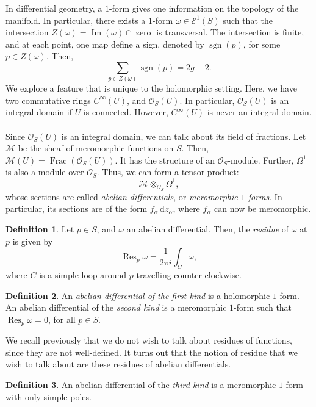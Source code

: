 \documentclass[a4paper]{report}
\theoremstyle{definition}
\newtheorem{definition}{Definition}
\theoremstyle{remark}
\theoremstyle{proposition}
\theoremstyle{conjecture}
\theoremstyle{lemma}
\theoremstyle{corollary}
\theoremstyle{exercise}
\theoremstyle{example}
\newcommand{\mcal}{\mathcal}
\newcommand{\diff}{\,\mathrm{d}}
\newcommand{\on}{\operatorname}
\begin{document}
In differential geometry, a $1$-form gives one information on the topology 
of the manifold. In particular, there exists a $1$-form 
$\omega \in \mcal{E}^1(S)$ such that the intersection 
$Z(\omega) = \on{Im}(\omega)\cap \on{zero}$ is transversal.
The intersection is finite, and at each point, one map define a sign,
denoted by $\on{sgn}(p)$, for some $p \in Z(\omega)$. 
Then,$$\sum_{p\in Z(\omega)} \on{sgn}(p) = 2g-2.$$
We explore
a feature that is unique to the holomorphic setting. Here, we have two 
commutative rings $C^\infty(U)$, and $\mcal{O}_S(U)$. In particular,
$\mcal{O}_S(U)$ is an integral domain if $U$ is connected. However,
$C^\infty(U)$ is never an integral domain. \\\\
Since $\mcal{O}_S(U)$ is an integral domain, we can talk about its field 
of fractions. 
Let $\mcal{M}$ be the sheaf of meromorphic functions on $S$. Then, 
$\mcal{M}(U) = \on{Frac}(\mcal{O}_S(U))$.
It has the structure of an $\mcal{O}_S$-module. Further, $\Omega^1$ is also
a module over $\mcal{O}_S$. Thus, we can form a tensor product:
$$\mcal{M}\otimes_{\mcal{O}_S} \Omega^1,$$
whose sections are called \emph{abelian differentials}, or \emph{meromorphic
$1$-forms}. In particular, its sections are of the form $f_\alpha\diff z_\alpha$,
where $f_\alpha$ can now be meromorphic.
\begin{definition}
    Let $p \in S$, and $\omega$ an abelian differential. 
    Then, the \emph{residue} of $\omega$ at $p$ is given by 
    $$\on{Res}_p\omega =\frac{1}{2\pi i} \int_C \omega,$$
    where $C$ is a simple loop around $p$ travelling counter-clockwise.
\end{definition}
\begin{definition}
    An \emph{abelian differential of the first kind} is a holomorphic 
    $1$-form. An abelian differential of the \emph{second kind} 
    is a meromorphic $1$-form such that $\on{Res}_p\omega = 0$,
    for all $p \in S$. 
\end{definition}

We recall previously that we do not wish to talk about residues of functions,
since they are not well-defined. It turns out that the notion of 
residue that we wish to talk about are these residues of abelian differentials.

\begin{definition}
    An abelian differential of the \emph{third kind} is a meromorphic 
    $1$-form with only simple poles.
\end{definition}
\end{document}
